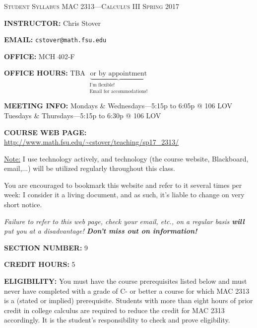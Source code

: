 \documentclass[12pt,oneside]{amsart}
\begin{document}
\centerline{\large\textsc{Student Syllabus} \hfill \textsc{MAC 2313---Calculus III} \hfill \textsc{Spring 2017}}\vspace{3mm}

\noindent \textbf{INSTRUCTOR:} Chris Stover%

\noindent \textbf{EMAIL:} \texttt{cstover@math.fsu.edu}%

\noindent \textbf{OFFICE:} MCH 402-F%

\noindent \textbf{OFFICE HOURS:} TBA $\underbrace{\text{or by appointment}}_{\substack{\text{I'm flexible!}\\\text{Email for accommodations!}}}$

\noindent \textbf{MEETING INFO:} Mondays \& Wednesdays---5:15p to 6:05p @ 106 LOV\\
\indent \hspace{35.5mm}Tuesdays \& Thursdays---5:15p to 6:30p @ 106 LOV%

\noindent \textbf{COURSE WEB PAGE:} \url{http://www.math.fsu.edu/~cstover/teaching/sp17_2313/}%

\vspace{-3mm}
\ul{Note:} I use technology actively, and technology (the course website, Blackboard, email,...) will be utilized regularly throughout this class. \vspace{-3mm}

You are encouraged to bookmark this website and refer to it several times per week: I consider it a living document, and as such, it's liable to change on very short notice.\vspace{-3mm}

\textit{Failure to refer to this web page, check your email, etc., on a regular basis \textbf{will} put you at a disadvantage! \textbf{Don't miss out on information!}}

\noindent \textbf{SECTION NUMBER:} 9%

\noindent \textbf{CREDIT HOURS:} 5

\noindent \textbf{ELIGIBILITY:} You must have the course prerequisites listed below and must never have completed with a grade of C- or better a course for which MAC
2313 is a (stated or implied) prerequisite. Students with more than eight hours of prior credit in college calculus are required to reduce the credit for MAC 2313 accordingly. It is the student's responsibility to check and prove eligibility.
\end{document}
